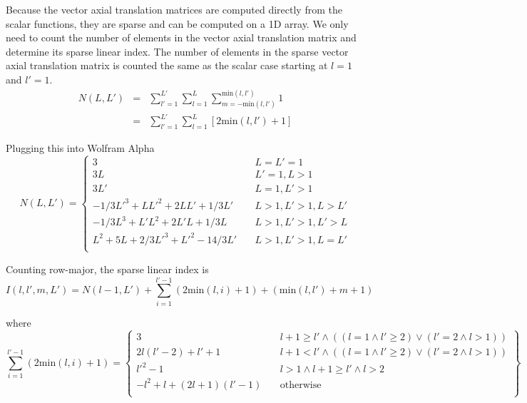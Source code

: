 Because the vector axial translation matrices are computed directly from the scalar functions, they are sparse and can be computed on a 1D array.  We only need to count the number of elements in the vector axial translation matrix and determine its sparse linear index. The number of elements in the sparse vector axial translation matrix is counted the same as the scalar case starting at $l=1$ and $l'=1$.  
\begin{eqnarray}
N(L,L') &=& \sum_{l' = 1}^{L'} \sum_{l=1}^{L} \sum_{m = -\textrm{min}(l,l')}^{\textrm{min}(l,l')} 1 \label{eq:NLL}\\
\ & = & \sum_{l' = 1}^{L'} \sum_{l=1}^{L} \left[ 2 \textrm{min}(l,l') + 1 \right]
\end{eqnarray}  

Plugging this into Wolfram Alpha
\begin{equation}
N(L,L') 
= \left\{
\begin{array}{ccc}
3 & \ & L =  L' = 1 \\
3L &\ & L' = 1, L >1\\
3L' & \ & L = 1 , L' >1\\
- 1/3L'^3  + L L'^2 + 2 LL' + 1/3L' & \ & L > 1, L' > 1, L > L'\\
-1/3L^3  + L'L^2 + 2L'L + 1/3L& \ &  L > 1, L' > 1, L'>L \\
L^2 + 5L + 2/3L'^3 + L'^2 - 14/3L' & \ & L > 1, L' > 1, L = L' \\
\end{array}
\right.
\end{equation}

Counting row-major, the sparse linear index is 
\begin{equation}
I(l,l',m,L') = N(l-1,L') + \sum_{i = 1}^{l'-1}  (2\textrm{min}(l,i) + 1)  + (\textrm{min}(l,l') + m + 1)  
\end{equation}

\noindent where
\begin{equation}
\sum_{i = 1}^{l'-1}  (2\textrm{min}(l,i) + 1) = 
\left\{\begin{array}{ccc} 
3 & \ & l + 1 \ge l' \land ((l=1 \land l' \ge 2) \lor (l' = 2 \land l > 1 )) \\
2l(l'-2) + l' + 1 & \ & l + 1 < l' \land ((l=1 \land l' \ge 2) \lor (l' = 2 \land l > 1 )) \\
l'^2 - 1  & \ & l > 1 \land l+1 \ge l' \land l > 2 \\
-l^2 + l + (2l + 1)(l'-1)& \ & \textrm{otherwise} \\
\end{array}
\right\}
\end{equation}  


